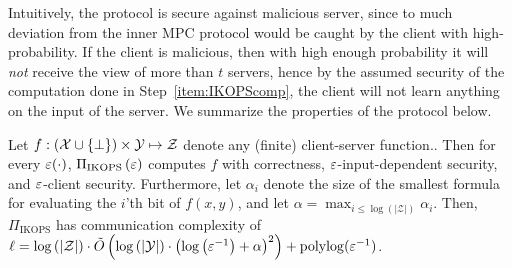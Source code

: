 \documentclass{llncs}
\newcommand{\OT}{\operatorname{OT}}
\newcommand{\sOT}[3]{#1\text{-out-of-}#2~#3\text{-string-}\OT}
\newcommand{\X}{\mathcal{X}}
\newcommand{\Y}{\mathcal{Y}}
\renewcommand{\Z}{\mathcal{Z}}
\newcommand{\IKOPS}{\operatorname{IKOPS}}
\begin{document}
Intuitively, the protocol is secure against malicious server, since to much deviation from the inner MPC protocol would be caught by the client with high-probability. If the client is malicious, then with high enough probability it will \emph{not} receive the view of more than $t$ servers, hence by the assumed security of the computation done in Step~\ref{item:IKOPScomp}, the client will not learn anything on the input of the server. We summarize the properties of the protocol below.

\begin{theorem}
	Let $f:(\X\cup\set{\bot})\times\Y\mapsto\Z$ denote any (finite) client-server function..
	Then for every $\varepsilon(\cdot)$, $\Pi_{\IKOPS}\of{\eps}$ computes $f$ with correctness, $\varepsilon$-input-dependent security, and $\varepsilon$-client security. Furthermore, let $\alpha_i$ denote the size of the smallest formula for evaluating the $i$'th bit of $f(x,y)$, and let $\alpha=\max_{i\leq \log(|\Z|)} \alpha_i$.	Then, $\Pi_{\IKOPS}$ has communication complexity of $\ell=\log\of{|\Z|}\cdot\tilde{O}\of{\log\of{|\Y|}\cdot\left(\log\of{{\eps^{-1}}}+\alpha\right)^2}+\polylog(\eps^{-1})$.
\end{theorem}


\end{document}
